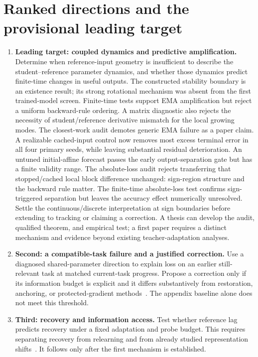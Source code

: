 \documentclass[11pt,a4paper]{article}
\begin{document}
\section{Ranked directions and the provisional leading target}
\begin{enumerate}[leftmargin=*]
\item \textbf{Leading target: coupled dynamics and predictive amplification.}
Determine when reference-input geometry is insufficient to describe the
student--reference parameter dynamics, and whether those dynamics predict
finite-time changes in useful outputs. The constructed stability boundary
is an existence result; its strong rotational mechanism was absent from
the first trained-model screen. Finite-time tests support EMA amplification
but reject a uniform backward-rule ordering. A matrix diagnostic also
rejects the necessity of student/reference derivative mismatch for the
local growing modes. The closest-work audit demotes generic EMA failure
as a paper claim. A realizable cached-input control now removes most
excess terminal error in all four primary seeds, while leaving substantial
residual deterioration. An untuned initial-affine forecast passes the
early output-separation gate but has a finite validity range. The
absolute-loss audit rejects transferring that stopped/cached local block
difference unchanged: sign-region structure and the backward rule matter.
The finite-time absolute-loss test confirms sign-triggered separation
but leaves the accuracy effect numerically unresolved. Settle the
continuous/discrete interpretation at sign boundaries before extending
to tracking or claiming a correction. A thesis can develop the audit, qualified theorem, and empirical
test; a first paper requires a distinct mechanism and evidence beyond
existing teacher-adaptation analyses.
\item \textbf{Second: a compatible-task failure and a justified correction.}
Use a diagnosed shared-parameter direction to explain loss on an earlier
still-relevant task at matched current-task progress. Propose a correction
only if its information budget is explicit and it differs substantively
from restoration, anchoring, or protected-gradient methods~\cite{ogd}.
The appendix baseline alone does not meet this threshold.
\item \textbf{Third: recovery and information access.}
Test whether reference lag predicts recovery under a fixed adaptation and
probe budget. This requires separating recovery from relearning and from
already studied representation shifts~\cite{spurious}. It follows only
after the first mechanism is established.
\end{enumerate}
\end{document}
